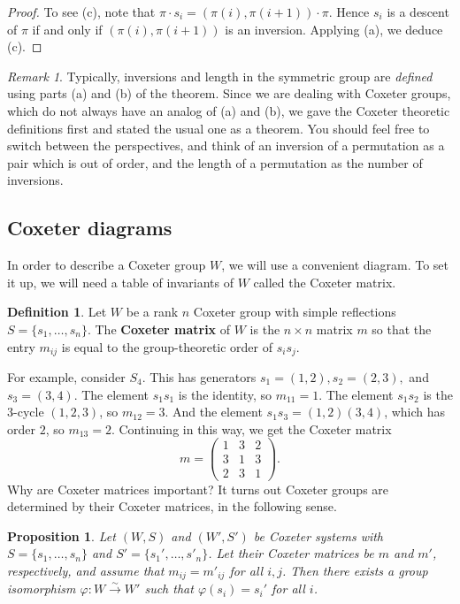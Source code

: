 \documentclass{article}
\numberwithin{equation}{section}
\newcommand{\newword}[1]{\textbf{#1}}
\newtheorem{proposition}[theorem]{Proposition}
\theoremstyle{remark}
\newtheorem{remark}[theorem]{Remark}
\theoremstyle{definition}
\newtheorem{definition}[theorem]{Definition}
\begin{document}
\begin{proof}
		
		To see (c), note that $\pi \cdot s_i = (\pi(i), \pi(i+1))\cdot \pi$. Hence $s_i$ is a descent of $\pi$ if and only if $(\pi(i),\pi(i+1))$ is an inversion. Applying (a), we deduce (c). 
	\end{proof}
	
	\begin{remark}
		Typically, inversions and length in the symmetric group are \emph{defined} using parts (a) and (b) of the theorem. Since we are dealing with Coxeter groups, which do not always have an analog of (a) and (b), we gave the Coxeter theoretic definitions first and stated the usual one as a theorem. You should feel free to switch between the perspectives, and think of an inversion of a permutation as a pair which is out of order, and the length of a permutation as the number of inversions. 
	\end{remark}
	
	\subsection{Coxeter diagrams}
	In order to describe a Coxeter group $W$, we will use a convenient diagram. To set it up, we will need a table of invariants of $W$ called the Coxeter matrix. 
	
	\begin{definition}
		Let $W$ be a rank $n$ Coxeter group with simple reflections $S = \{s_1,\ldots, s_n\}$. The \newword{Coxeter matrix} of $W$ is the $n\times n$ matrix $m$ so that the entry $m_{ij}$ is equal to the group-theoretic order of $s_is_j$. 
	\end{definition}
	
	For example, consider $S_4$. This has generators $s_1=(1,2),s_2=(2,3),$ and $s_3=(3,4)$. The element $s_1s_1$ is the identity, so $m_{11}=1$. The element $s_1s_2$ is the $3$-cycle $(1,2,3)$, so $m_{12}=3$. And the element $s_1s_3 = (1,2)(3,4)$, which has order $2$, so $m_{13}=2$. Continuing in this way, we get the Coxeter matrix
	\[ m = \begin{pmatrix}
		1 & 3 & 2 \\
		3 & 1 & 3 \\
		2 & 3 & 1
	\end{pmatrix}. \]
	Why are Coxeter matrices important? It turns out Coxeter groups are determined by their Coxeter matrices, in the following sense.
	
	\begin{proposition}
		Let $(W,S)$ and $(W',S')$ be Coxeter systems with $S=\{s_1,\ldots, s_n\}$ and $S'=\{s_1',\ldots, s'_n\}$. Let their Coxeter matrices be $m$ and $m'$, respectively, and assume that $m_{ij} = m'_{ij}$ for all $i,j$. Then there exists a group isomorphism $\varphi : W \xrightarrow{\sim} W'$ such that $\varphi(s_i) = s_i'$ for all $i$.
	\end{proposition}
	
\end{document}
